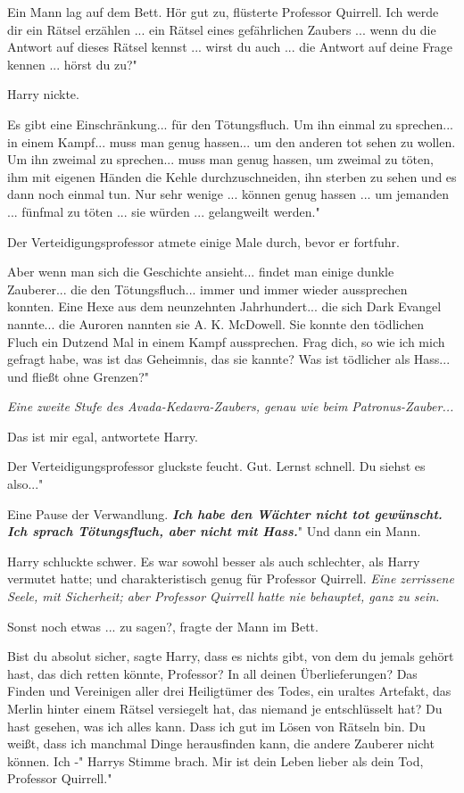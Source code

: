 Ein Mann lag auf dem Bett. \glqq Hör gut zu\grqq{}, flüsterte Professor
Quirrell. \glqq Ich werde dir ein Rätsel erzählen ... ein Rätsel eines
gefährlichen Zaubers ... wenn du die Antwort auf dieses Rätsel kennst ... wirst
du auch ... die Antwort auf deine Frage kennen ... hörst du zu?"

Harry nickte.

\glqq Es gibt eine Einschränkung... für den Tötungsfluch. Um ihn einmal zu
sprechen... in einem Kampf... muss man genug hassen... um den anderen tot sehen
zu wollen. Um ihn zweimal zu sprechen... muss man genug hassen, um zweimal zu
töten, ihm mit eigenen Händen die Kehle durchzuschneiden, ihn sterben zu sehen
und es dann noch einmal tun. Nur sehr wenige ... können genug hassen ... um
jemanden ... fünfmal zu töten ... sie würden ... gelangweilt werden."

Der Verteidigungsprofessor atmete einige Male durch, bevor er fortfuhr.

\glqq Aber wenn man sich die Geschichte ansieht... findet man einige dunkle
Zauberer... die den Tötungsfluch... immer und immer wieder aussprechen konnten.
Eine Hexe aus dem neunzehnten Jahrhundert... die sich Dark Evangel nannte... die
Auroren nannten sie A. K. McDowell. Sie konnte den tödlichen Fluch ein Dutzend
Mal in einem Kampf aussprechen. Frag dich, so wie ich mich gefragt habe, was ist
das Geheimnis, das sie kannte? Was ist tödlicher als Hass... und fließt ohne
Grenzen?"

\emph{Eine zweite Stufe des Avada-Kedavra-Zaubers, genau wie beim Patronus-Zauber...}

\glqq Das ist mir egal\grqq{}, antwortete Harry.

Der Verteidigungsprofessor gluckste feucht. \glqq Gut. Lernst schnell. Du siehst
es also..."

Eine Pause der Verwandlung. \glqq \textbf{\emph{Ich habe den Wächter nicht tot
gewünscht. Ich sprach Tötungsfluch, aber nicht mit Hass.}}" Und dann ein Mann.

Harry schluckte schwer. Es war sowohl besser als auch schlechter, als Harry
vermutet hatte; und charakteristisch genug für Professor Quirrell.
\emph{Eine zerrissene Seele, mit Sicherheit; aber Professor Quirrell hatte nie behauptet, ganz zu sein.}

\glqq Sonst noch etwas ... zu sagen?\grqq{}, fragte der Mann im Bett.

\glqq Bist du absolut sicher\grqq{}, sagte Harry, \glqq dass es nichts gibt, von
dem du jemals gehört hast, das dich retten könnte, Professor? In all deinen
Überlieferungen? Das Finden und Vereinigen aller drei Heiligtümer des Todes, ein
uraltes Artefakt, das Merlin hinter einem Rätsel versiegelt hat, das niemand je
entschlüsselt hat? Du hast gesehen, was ich alles kann. Dass ich gut im Lösen
von Rätseln bin. Du weißt, dass ich manchmal Dinge herausfinden kann, die andere
Zauberer nicht können. Ich -" Harrys Stimme brach. \glqq Mir ist dein Leben
lieber als dein Tod, Professor Quirrell."

